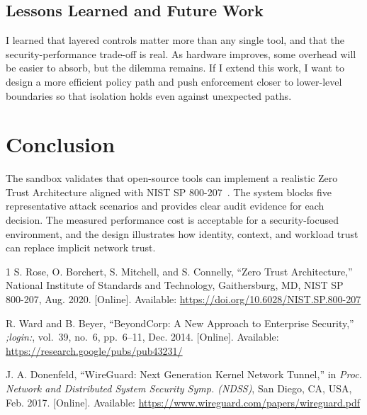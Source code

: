 \documentclass[conference]{IEEEtran}
\begin{document}
\subsection{Lessons Learned and Future Work}
I learned that layered controls matter more than any single tool, and that the
security-performance trade-off is real. As hardware improves, some overhead will be
easier to absorb, but the dilemma remains. If I extend this work, I want to design a
more efficient policy path and push enforcement closer to lower-level boundaries so
that isolation holds even against unexpected paths.

\vspace{4pt}
\section{Conclusion}
The sandbox validates that open-source tools can implement a realistic Zero Trust
Architecture aligned with NIST SP 800-207~\cite{nist}. The system blocks five representative
attack scenarios and provides clear audit evidence for each decision. The measured
performance cost is acceptable for a security-focused environment, and the design
illustrates how identity, context, and workload trust can replace implicit network
trust.

\begin{thebibliography}{1}
S. Rose, O. Borchert, S. Mitchell, and S. Connelly, ``Zero Trust Architecture,''
National Institute of Standards and Technology, Gaithersburg, MD, NIST SP 800-207, Aug. 2020. [Online]. Available: \url{https://doi.org/10.6028/NIST.SP.800-207}

R. Ward and B. Beyer, ``BeyondCorp: A New Approach to Enterprise Security,''
\textit{;login:}, vol.~39, no.~6, pp.~6--11, Dec. 2014. [Online]. Available: \url{https://research.google/pubs/pub43231/}

J. A. Donenfeld, ``WireGuard: Next Generation Kernel Network Tunnel,''
in \textit{Proc. Network and Distributed System Security Symp. (NDSS)}, San Diego, CA, USA, Feb. 2017. [Online]. Available: \url{https://www.wireguard.com/papers/wireguard.pdf}
\end{thebibliography}
\end{document}
